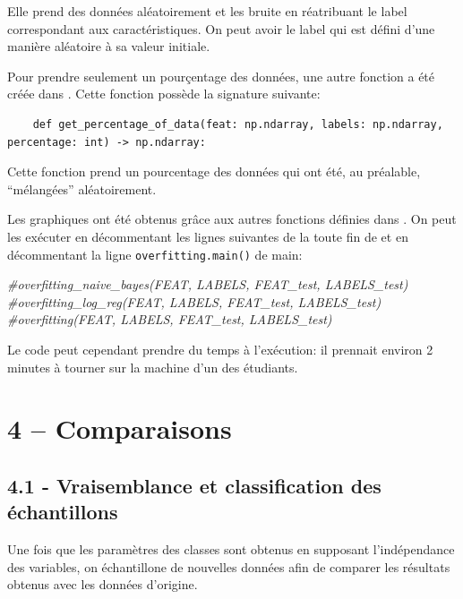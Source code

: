 \documentclass[
]{article}
\newenvironment{Shaded}{}{}
\newcommand{\CommentTok}[1]{\textcolor[rgb]{0.38,0.63,0.69}{\textit{#1}}}
\begin{document}
Elle prend des données aléatoirement et les bruite en réatribuant le
label correspondant aux caractéristiques. On peut avoir le label qui est
défini d'une manière aléatoire à sa valeur initiale.

Pour prendre seulement un pourçentage des données, une autre fonction a
été créée dans . Cette fonction possède la
signature suivante:

\begin{lstlisting}
    def get_percentage_of_data(feat: np.ndarray, labels: np.ndarray, percentage: int) -> np.ndarray:
\end{lstlisting}

Cette fonction prend un pourcentage des données qui ont été, au
préalable, ``mélangées'' aléatoirement.

Les graphiques ont été obtenus grâce aux autres fonctions définies dans
. On peut les exécuter en décommentant les lignes
suivantes de la toute fin de  et en décommentant la
ligne \texttt{overfitting.main()} de main:

\begin{Shaded}
\begin{Highlighting}[]
\CommentTok{\#overfitting\_naive\_bayes(FEAT, LABELS, FEAT\_test, LABELS\_test)}
\CommentTok{\#overfitting\_log\_reg(FEAT, LABELS, FEAT\_test, LABELS\_test)}
\CommentTok{\#overfitting(FEAT, LABELS, FEAT\_test, LABELS\_test)}
\end{Highlighting}
\end{Shaded}

Le code peut cependant prendre du temps à l'exécution: il prennait
environ 2 minutes à tourner sur la machine d'un des étudiants.

\newpage{}

\section{4 -- Comparaisons}\label{comparaisons}

\subsection{4.1 - Vraisemblance et classification des
échantillons}\label{vraisemblance-et-classification-des-uxe9chantillons}

Une fois que les paramètres des classes sont obtenus en supposant
l'indépendance des variables, on échantillone de nouvelles données afin
de comparer les résultats obtenus avec les données d'origine.
\end{document}
